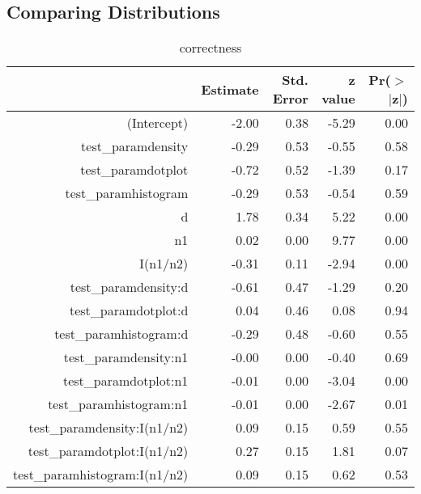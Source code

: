 \subsection{Comparing Distributions}

\begin{table}[ht]
\begin{center}
\begin{tabular}{rrrrr}
  \hline
 & Estimate & Std. Error & z value & Pr($>$$|$z$|$) \\ 
  \hline
(Intercept) & -2.00 & 0.38 & -5.29 & 0.00 \\ 
  test\_paramdensity & -0.29 & 0.53 & -0.55 & 0.58 \\ 
  test\_paramdotplot & -0.72 & 0.52 & -1.39 & 0.17 \\ 
  test\_paramhistogram & -0.29 & 0.53 & -0.54 & 0.59 \\ 
  d & 1.78 & 0.34 & 5.22 & 0.00 \\ 
  n1 & 0.02 & 0.00 & 9.77 & 0.00 \\ 
  I(n1/n2) & -0.31 & 0.11 & -2.94 & 0.00 \\ 
  test\_paramdensity:d & -0.61 & 0.47 & -1.29 & 0.20 \\ 
  test\_paramdotplot:d & 0.04 & 0.46 & 0.08 & 0.94 \\ 
  test\_paramhistogram:d & -0.29 & 0.48 & -0.60 & 0.55 \\ 
  test\_paramdensity:n1 & -0.00 & 0.00 & -0.40 & 0.69 \\ 
  test\_paramdotplot:n1 & -0.01 & 0.00 & -3.04 & 0.00 \\ 
  test\_paramhistogram:n1 & -0.01 & 0.00 & -2.67 & 0.01 \\ 
  test\_paramdensity:I(n1/n2) & 0.09 & 0.15 & 0.59 & 0.55 \\ 
  test\_paramdotplot:I(n1/n2) & 0.27 & 0.15 & 1.81 & 0.07 \\ 
  test\_paramhistogram:I(n1/n2) & 0.09 & 0.15 & 0.62 & 0.53 \\ 
   \hline
\end{tabular}
\end{center}
\caption{correctness}
\end{table}

